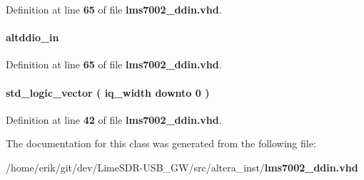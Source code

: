 Definition at line {\bf 65} of file {\bf lms7002\+\_\+ddin.\+vhd}.

\paragraph[{altddio\+\_\+in\+\_\+component}]{ {\bfseries \textcolor{vhdlchar}{altddio\+\_\+in}\textcolor{vhdlchar}{ }} \hspace{0.3cm}{\ttfamily [Instantiation]}}\label{classlms7002__ddin_1_1arch_a1028169cb9a3c4b1883e921d0b505fbb}


Definition at line {\bf 65} of file {\bf lms7002\+\_\+ddin.\+vhd}.

\paragraph[{datain}]{ {\bfseries \textcolor{comment}{std\+\_\+logic\+\_\+vector}\textcolor{vhdlchar}{ }\textcolor{vhdlchar}{(}\textcolor{vhdlchar}{ }\textcolor{vhdlchar}{ }\textcolor{vhdlchar}{ }\textcolor{vhdlchar}{ }{\bfseries {\bf iq\+\_\+width}} \textcolor{vhdlchar}{ }\textcolor{keywordflow}{downto}\textcolor{vhdlchar}{ }\textcolor{vhdlchar}{ } \textcolor{vhdldigit}{0} \textcolor{vhdlchar}{ }\textcolor{vhdlchar}{)}\textcolor{vhdlchar}{ }} \hspace{0.3cm}{\ttfamily [Signal]}}\label{classlms7002__ddin_1_1arch_a344420c0f3854ee08cb5085a1905634b}


Definition at line {\bf 42} of file {\bf lms7002\+\_\+ddin.\+vhd}.



The documentation for this class was generated from the following file\+:\begin{DoxyCompactItemize}
\item 
/home/erik/git/dev/\+Lime\+S\+D\+R-\/\+U\+S\+B\+\_\+\+G\+W/src/altera\+\_\+inst/{\bf lms7002\+\_\+ddin.\+vhd}\end{DoxyCompactItemize}

